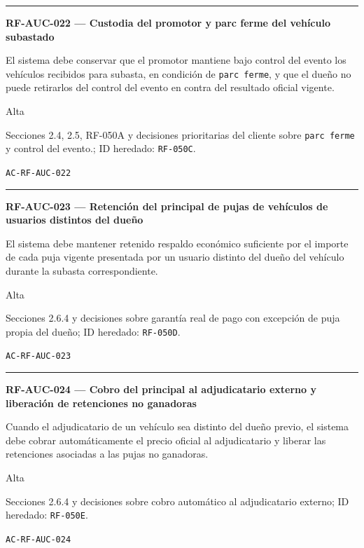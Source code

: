 \documentclass[10pt,letterpaper]{article}
\begin{document}
\vspace{0.25em}\hrule\vspace{0.65em}
\noindent\textbf{RF-AUC-022 --- Custodia del promotor y parc ferme del vehículo subastado}\par
\begin{description}[style=nextline,leftmargin=3.15cm,labelwidth=2.8cm,font=\normalfont\bfseries]
\item[Obligación] El sistema debe conservar que el promotor mantiene bajo control del evento los vehículos recibidos para subasta, en condición de \texttt{parc ferme}, y que el dueño no puede retirarlos del control del evento en contra del resultado oficial vigente.
\item[Prioridad] Alta
\item[Procedencia] Secciones 2.4, 2.5, RF-050A y decisiones prioritarias del cliente sobre \texttt{parc ferme} y control del evento.; ID heredado: \texttt{RF-050C}.
\item[Verificación] \texttt{AC-RF-AUC-022}
\end{description}
\vspace{0.25em}\hrule\vspace{0.65em}
\noindent\textbf{RF-AUC-023 --- Retención del principal de pujas de vehículos de usuarios distintos del dueño}\par
\begin{description}[style=nextline,leftmargin=3.15cm,labelwidth=2.8cm,font=\normalfont\bfseries]
\item[Obligación] El sistema debe mantener retenido respaldo económico suficiente por el importe de cada puja vigente presentada por un usuario distinto del dueño del vehículo durante la subasta correspondiente.
\item[Prioridad] Alta
\item[Procedencia] Secciones 2.6.4 y decisiones sobre garantía real de pago con excepción de puja propia del dueño; ID heredado: \texttt{RF-050D}.
\item[Verificación] \texttt{AC-RF-AUC-023}
\end{description}
\vspace{0.25em}\hrule\vspace{0.65em}
\noindent\textbf{RF-AUC-024 --- Cobro del principal al adjudicatario externo y liberación de retenciones no ganadoras}\par
\begin{description}[style=nextline,leftmargin=3.15cm,labelwidth=2.8cm,font=\normalfont\bfseries]
\item[Obligación] Cuando el adjudicatario de un vehículo sea distinto del dueño previo, el sistema debe cobrar automáticamente el precio oficial al adjudicatario y liberar las retenciones asociadas a las pujas no ganadoras.
\item[Prioridad] Alta
\item[Procedencia] Secciones 2.6.4 y decisiones sobre cobro automático al adjudicatario externo; ID heredado: \texttt{RF-050E}.
\item[Verificación] \texttt{AC-RF-AUC-024}
\end{description}
\end{document}
